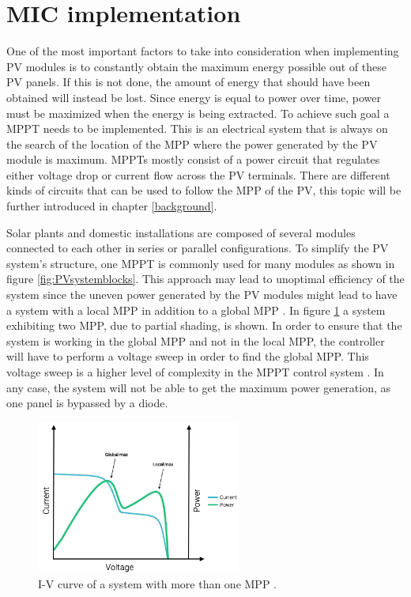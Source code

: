 
\section{MIC implementation}
One of the most important factors to take into consideration when implementing PV modules is to constantly obtain the maximum energy possible out of these PV panels. If this is not done, the amount of energy that should have been obtained will instead be lost. Since energy is equal to power over time, power must be maximized when the energy is being extracted. To achieve such goal a MPPT needs to be implemented. This is an electrical system that is always on the search of the location of the MPP where the power generated by the PV module is maximum. MPPTs mostly consist of a power circuit that regulates either voltage drop or current flow across the PV terminals. There are different kinds of circuits that can be used to follow the MPP of the PV, this topic will be further introduced in chapter \ref{background}.

Solar plants and domestic installations are composed of several modules connected to each other in series or parallel configurations. To simplify the PV system's structure, one MPPT is commonly used for many modules as shown in figure \ref{fig:PVsystemblocks}. This approach may lead to unoptimal efficiency of the system since the uneven power generated by the PV modules might lead to have a system with a local MPP in addition to a global MPP \cite{AN1521_MC}. In figure \ref{multiple_local_MPP} a system exhibiting two MPP, due to partial shading, is shown. In order to ensure that the system is working in the global MPP and not in the local MPP, the controller will have to perform a voltage sweep in order to find the global MPP. This voltage sweep is a higher level of complexity in the MPPT control system \cite{AN1521_MC}. In any case, the system will not be able to get the maximum power generation, as one panel is bypassed by a diode.

\vspace{0.6cm}
\begin{figure}[htbp]
	\begin{center}
		\includegraphics[width=0.6\textwidth]{../Pictures/local_MPP}
		\caption{I-V curve of a system with more than one MPP \cite{local_mpp}.}
		\label{multiple_local_MPP}
	\end{center}	
\end{figure}

